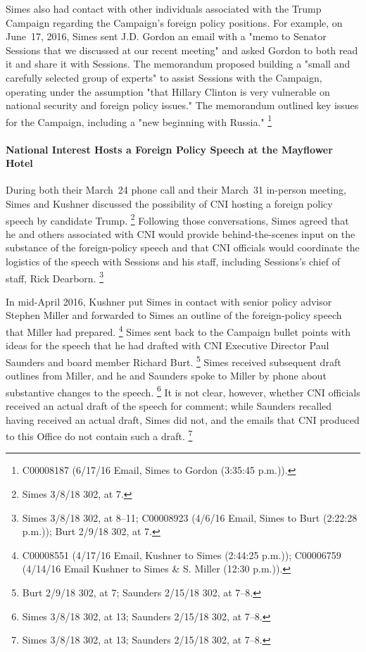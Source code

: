 Simes also had contact with other individuals associated with the Trump Campaign regarding the Campaign's foreign policy positions.
For example, on June~17, 2016, Simes sent J.D. Gordon an email with a "memo to Senator Sessions that we discussed at our recent meeting" and asked Gordon to both read it and share it with Sessions.
The memorandum proposed building a "small and carefully selected group of experts" to assist Sessions with the Campaign, operating under the assumption "that Hillary Clinton is very vulnerable on national security and foreign policy issues."
The memorandum outlined key issues for the Campaign, including a "new beginning with Russia."%
\footnote{C00008187 (6/17/16 Email, Simes to Gordon (3:35:45 p.m.)).}

\paragraph{National Interest Hosts a Foreign Policy Speech at the Mayflower Hotel}

During both their March~24 phone call and their March~31 in-person meeting, Simes and Kushner discussed the possibility of CNI hosting a foreign policy speech by candidate Trump.%
\footnote{Simes 3/8/18 302, at 7.}
Following those conversations, Simes agreed that he and others associated with CNI would provide behind-the-scenes input on the substance of the foreign-policy speech and that CNI officials would coordinate the logistics of the speech with Sessions and his staff, including Sessions's chief of staff, Rick Dearborn.%
\footnote{Simes 3/8/18 302, at 8--11;
C00008923 (4/6/16 Email, Simes to Burt (2:22:28 p.m.));
Burt 2/9/18 302, at 7.}

In mid-April 2016, Kushner put Simes in contact with senior policy advisor Stephen Miller and forwarded to Simes an outline of the foreign-policy speech that Miller had prepared.%
\footnote{C00008551 (4/17/16 Email, Kushner to Simes (2:44:25 p.m.));
C00006759 (4/14/16 Email Kushner to Simes \& S. Miller (12:30 p.m.)).}
Simes sent back to the Campaign bullet points with ideas for the speech that he had drafted with CNI Executive Director Paul Saunders and board member Richard Burt.%
\footnote{Burt 2/9/18 302, at 7;
Saunders 2/15/18 302, at 7--8.}
Simes received subsequent draft outlines from Miller, and he and Saunders spoke to Miller by phone about substantive changes to the speech.%
\footnote{Simes 3/8/18 302, at 13;
Saunders 2/15/18 302, at 7--8.}
It is not clear, however, whether CNI officials received an actual draft of the speech for comment; while Saunders recalled having received an actual draft, Simes did not, and the emails that CNI produced to this Office do not contain such a draft.%
\footnote{Simes 3/8/18 302, at 13;
Saunders 2/15/18 302, at 7--8.}

